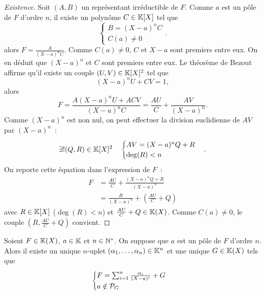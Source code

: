 \begin{proof}[Existence]
  Soit \((A,B)\) un représentant irréductible de \(F\). Comme \(a\) est un pôle de \(F\) d'ordre \(n\), il existe un polynôme \(C \in \K[X]\) tel que
  \begin{equation}
    \begin{cases} B=(X-a)^nC \\ C(a) \neq 0 \end{cases}.
  \end{equation}
  alors \(F=\frac{A}{(X-a)^nC}\). Comme \(C(a)\neq 0\), \(C\) et \(X-a\) sont premiers entre eux. On en déduit que \((X-a)^n\) et \(C\) sont premiers entre eux. Le théorème de Bezout affirme qu'il existe un couple \((U,V) \in \K[X]^2\) tel que
  \begin{equation}
    (X-a)^nU+CV=1,
  \end{equation}
  alors
  \begin{equation}
    F = \frac{A(X-a)^nU+ACV}{(X-a)^nC} = \frac{AU}{C} + \frac{AV}{(X-a)^n}.
  \end{equation}
  Comme \((X-a)^n\) est non nul, on peut effectuer la division euclidienne de \(AV\) par \((X-a)^n\)~:
  \begin{equation}
    \exists! (Q,R) \in \K[X]^2 \quad \begin{cases} AV=(X-a)^nQ+R \\ \deg(R)<n \end{cases}.
  \end{equation}
  On reporte cette équation dans l'expression de \(F\)~:
  \begin{align}
    F&=\frac{AU}{C} + \frac{(X-a)^nQ+R}{(X-a)^n}\\
    &=\frac{R}{(X-a)^n} + \left(\frac{AU}{C}+Q\right)
  \end{align}
  avec \(R \in \K[X]\) (\(\deg(R)<n\)) et \(\frac{AU}{C}+Q \in \K(X)\). Comme \(C(a)\neq 0\), le couple \((R,\frac{AU}{C}+Q)\) convient.
\end{proof}

\begin{theo}
  Soient \(F \in \K(X)\), \(a \in \K\) et \(n \in \N^*\). On suppose que \(a\) est un pôle de \(F\) d'ordre \(n\). Alors il existe un unique \(n\)-uplet \((\alpha_1, \ldots, \alpha_n) \in \K^n\) et une unique \(G \in \K(X)\) tels que
  \begin{equation}
    \begin{cases} F = \sum_{i=1}^n \frac{\alpha_i}{(X-a)^i} + G \\ a \notin \P_G \end{cases}
  \end{equation}
\end{theo}

